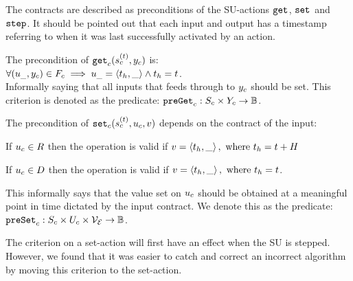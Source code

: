 The contracts are described as preconditions of the SU-actions $\mathtt{get}_{}$, $\mathtt{set}_{}$ and $\mathtt{step}_{}$.
It should be pointed out that each input and output has a timestamp referring to when it was last successfully activated by an action. 
\begin{definition}\label{def:getout}  
  The precondition of $\mathtt{get}_{c}(s_{c}^{(t)}, y_{c})$ is: \\
  $\forall (u_{\_}, y_{c}) \in F_{c} \implies u_{\_} =  \left\langle t_h, \_ \right\rangle  \land t_h = t$.\\
  Informally saying that all inputs that feeds through to $y_{c}$ should be set.
  This criterion is denoted as the predicate: $\mathtt{preGet}_{c}: S_{c} \times Y_{c} \to \mathbb{B}$.
\end{definition}
\begin{definition}\label{def:setin}
  The precondition of $\mathtt{set}_{c}(s_{c}^{(t)}, u_{c}, v)$ depends on the contract of the input:
  \begin{compactitem}
    \item If $u_{c} \in R$ then the operation is valid if $v=  \left\langle t_h,\_ \right\rangle , \textrm{ where } t_h = t+H$
    \item If $u_{c} \in D$ then the operation is valid if $v=  \left\langle t_h,\_ \right\rangle , \textrm{ where } t_h = t$.
  \end{compactitem} 
  This informally says that the value set on $u_{c}$ should be obtained at a meaningful point in time dictated by the input contract.
  We denote this as the predicate: $\mathtt{preSet}_{c}: S_{c} \times U_{c} \times \mathcal{V_{E}}  \to \mathbb{B}$.
  \end{definition}

  The criterion on a set-action will first have an effect when the SU is stepped. However, we found that it was easier to catch and correct an incorrect algorithm by moving this criterion to the set-action. 
  
